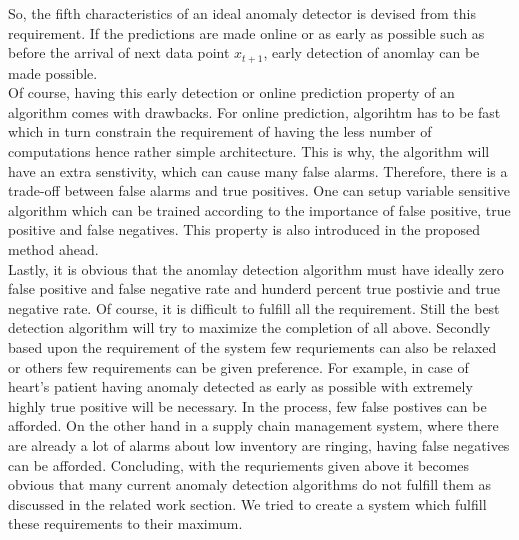 \documentclass[12pt]{article}
\begin{document}
So, the fifth characteristics of an  ideal anomaly detector is devised from this requirement. If the predictions are made online or as early as possible such as before the arrival of next data point $x_{t+1}$, early detection of anomlay can be made possible. \\
\break
Of course, having this early detection or online prediction property of an algorithm comes with drawbacks. For online prediction, algorihtm has to be fast which in turn constrain the requirement of having the less number of computations hence rather simple architecture. This is why, the algorithm will have an extra senstivity, which can cause many false alarms. Therefore, there is a trade-off between false alarms and  true positives. One can setup variable sensitive algorithm which can be trained according to the importance of false positive, true positive and false negatives. This property is also introduced in the proposed method ahead.\\
\break
Lastly, it is obvious that the anomlay detection algorithm must have ideally zero false positive and false negative rate and hunderd percent true postivie and true negative rate.
Of course, it is difficult to fulfill all the requirement. Still the best detection algorithm will try to maximize the completion of all above. Secondly based upon the requirement of the system few requriements can also be relaxed or others few requirements can be given preference. For example, in case of heart's patient having anomaly detected as early as possible with extremely highly true positive will be necessary. In the process, few false postives can be afforded. On the other hand in a supply chain management system, where there are already a lot of alarms about low inventory are ringing, having false negatives can be afforded.
\newpage
Concluding, with the requriements given above it becomes obvious that many current anomaly detection algorithms do not fulfill them as discussed in the related work section. We tried to create a system which fulfill these requirements to their maximum.
\end{document}
